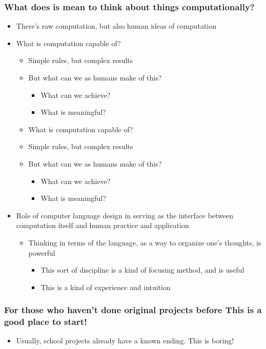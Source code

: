 \documentclass[11pt]{article}
\theoremstyle{definition}
\begin{document}
\subsubsection{What does is mean to think about things computationally?}
\begin{itemize}
\item There’s raw computation, but also human ideas of computation
\item What is computation capable of?
\begin{itemize}
\item Simple rules, but complex results
\item But what can we as humans make of this?
\begin{itemize}
\item What can we achieve?
\item What is meaningful?
\end{itemize}
\item What is computation capable of?
\item Simple rules, but complex results
\item But what can we as humans make of this?
\begin{itemize}
\item What can we achieve?
\item What is meaningful?
\end{itemize}
\end{itemize}
\item Role of computer language design in serving as the interface between computation itself and human practice and application
\begin{itemize}
\item Thinking in terms of the language, as a way to organize one’s thoughts, is powerful
\begin{itemize}
\item This sort of discipline is a kind of focusing method, and is useful
\item This is a kind of experience and intuition
\end{itemize}
\end{itemize}
\end{itemize}

\subsubsection{For those who haven’t done original projects before This is a good place to start!}
\begin{itemize}
\item Usually, school projects already have a known ending. This is boring!
\end{itemize}
\end{document}
